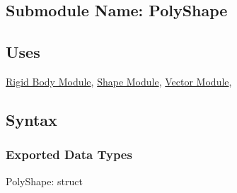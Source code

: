 \documentclass[12pt]{article}
\newcommand{\Body}{\hyperref[MISBody]{Rigid Body Module}}
\newcommand{\Shape}{\hyperref[MISShape]{Shape Module}}
\newcommand{\Vector}{\hyperref[MISVector]{Vector Module}}
\begin{document}
\subsection{Submodule Name: PolyShape} \label{MISPoly}

\subsection{Uses} \label{SecUPoly}
	\Body, \Shape, \Vector, 

\subsection{Syntax}

\subsubsection{Exported Data Types} \label{SecEDTPoly}
PolyShape: struct
\end{document}
